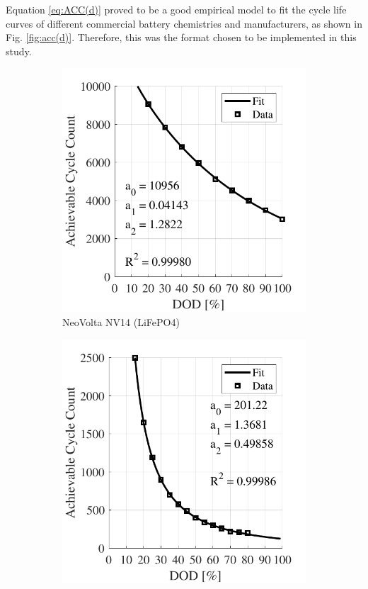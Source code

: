 \documentclass{ieeeaccess}
\begin{document}
    Equation \eqref{eq:ACC(d)} proved to be a good empirical model to fit the cycle life curves of different commercial battery chemistries and manufacturers, as shown in Fig. \ref{fig:acc(d)}. Therefore, this was the format chosen to be implemented in this study.
    \begin{figure}[!h]
        \begin{subfigure}{.235\textwidth}
            \centering
            \includegraphics[width=\linewidth]{figures/acc_fitting_NeoVolta_NV24_LiFePO4.pdf}
            \caption{NeoVolta NV14 (LiFePO4)}
            \label{fig:accNeovolta}
        \end{subfigure}
        \begin{subfigure}{.235\textwidth}
            \centering
            \includegraphics[width=\linewidth]{figures/acc_fitting_Moura_12MF220_lead-acid.pdf}

\end{subfigure}
\end{figure}
\end{document}
